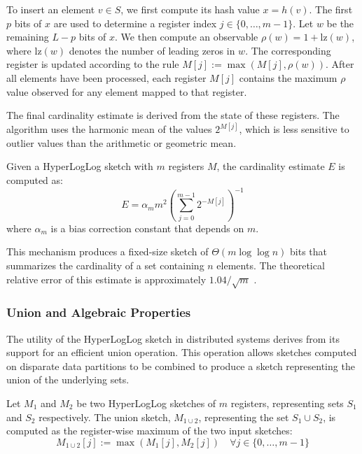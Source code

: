 To insert an element $v \in S$, we first compute its hash value $x = h(v)$. The first $p$ bits of $x$ are used to determine a register index $j \in \{0, \dots, m-1\}$. Let $w$ be the remaining $L-p$ bits of $x$. We then compute an observable $\rho(w) = 1 + \text{lz}(w)$, where $\text{lz}(w)$ denotes the number of leading zeros in $w$. The corresponding register is updated according to the rule $M[j] := \max(M[j], \rho(w))$. After all elements have been processed, each register $M[j]$ contains the maximum $\rho$ value observed for any element mapped to that register.

The final cardinality estimate is derived from the state of these registers. The algorithm uses the harmonic mean of the values $2^{M[j]}$, which is less sensitive to outlier values than the arithmetic or geometric mean.

\begin{proposition}
    Given a HyperLogLog sketch with $m$ registers $M$, the cardinality estimate $E$ is computed as:
    \begin{equation*}
        E = \alpha_m m^2 \left( \sum_{j=0}^{m-1} 2^{-M[j]} \right)^{-1}
    \end{equation*}
    where $\alpha_m$ is a bias correction constant that depends on $m$.
\end{proposition}

This mechanism produces a fixed-size sketch of $\Theta(m \log\log n)$ bits that summarizes the cardinality of a set containing $n$ elements. The theoretical relative error of this estimate is approximately $1.04/\sqrt{m}$ \cite{Flajolet2007HyperLogLogTA}.

\subsubsection{Union and Algebraic Properties} \label{subsubsec:hll-union}

The utility of the HyperLogLog sketch in distributed systems derives from its support for an efficient union operation. This operation allows sketches computed on disparate data partitions to be combined to produce a sketch representing the union of the underlying sets.

\begin{definition}
    Let $M_1$ and $M_2$ be two HyperLogLog sketches of $m$ registers, representing sets $S_1$ and $S_2$ respectively. The union sketch, $M_{1 \cup 2}$, representing the set $S_1 \cup S_2$, is computed as the register-wise maximum of the two input sketches:
    \begin{equation*}
        M_{1 \cup 2}[j] := \max(M_1[j], M_2[j]) \quad \forall j \in \{0, \ldots, m-1\}
    \end{equation*}
\end{definition}

